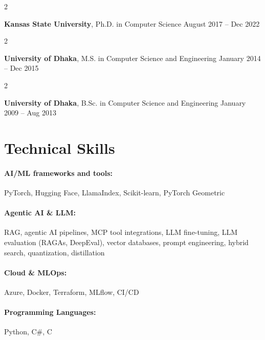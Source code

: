 \documentclass[10pt, letterpaper]{article}
\newenvironment{twocolentry}[2][]{
    \onecolentry
    \def\secondColumn{#2}
    \setcolumnwidth{\fill, 4.5 cm}
    \begin{paracol}{2}
}{
    \switchcolumn \raggedleft \secondColumn
    \end{paracol}
    \endonecolentry
} %
\begin{document}
        \begin{twocolentry}{
            August 2017 -- Dec 2022
        }
            \textbf{Kansas State University}, Ph.D. in Computer Science\end{twocolentry}

        \begin{twocolentry}{
            January 2014 -- Dec 2015
        }
            \textbf{University of Dhaka}, M.S. in Computer Science and Engineering\end{twocolentry}

        \begin{twocolentry}{
            January 2009 -- Aug 2013
        }
            \textbf{University of Dhaka}, B.Sc. in Computer Science and Engineering\end{twocolentry}

\vspace{-1mm}
\section{Technical Skills}

        \paragraph{AI/ML frameworks and tools:} PyTorch, Hugging Face, LlamaIndex, Scikit-learn, PyTorch Geometric
        \vspace{-4mm}
        \paragraph{Agentic AI \& LLM:} RAG, agentic AI pipelines, MCP tool integrations, LLM fine-tuning, LLM evaluation (RAGAs, DeepEval), vector databases, prompt engineering, hybrid search, quantization, distillation
        \vspace{-4mm}
        \paragraph{Cloud \& MLOps:} Azure, Docker, Terraform, MLflow, CI/CD
        \vspace{-4mm}
        \paragraph{Programming Languages:} Python, C\#, C
\end{document}
